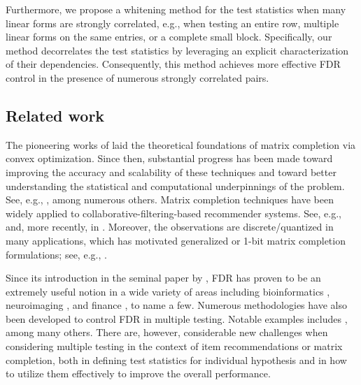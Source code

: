 \documentclass[12pt]{article}
\theoremstyle{plain}
\begin{document}
\begin{sloppypar}
Furthermore, we propose a whitening method for the test statistics when many linear forms are strongly correlated, e.g., when testing an entire row, multiple linear forms on the same entries, or a complete small block. Specifically, our method decorrelates the test statistics by leveraging an explicit characterization of their dependencies. Consequently, this method achieves more effective FDR control in the presence of numerous strongly correlated pairs. 



\subsection{Related work}

The pioneering works of \cite{candes2009power,candes2010matrix,candes2012exact} laid the theoretical foundations of matrix completion via convex optimization. Since then, substantial progress has been made toward improving the accuracy and scalability of these techniques and toward better understanding the statistical and computational underpinnings of the problem. See, e.g., \cite{cai2010singular,keshavan2010matrix,recht2010guaranteed,gross2011recovering,koltchinskii2011nuclear,liu2011universal,negahban2011estimation,rohde2011estimation,tsybakov2011nuclear,negahban2012restricted,sun2012calibrated,klopp2014noisy,cai2015rop,cai2016matrix,gao2016optimal}, among numerous others. Matrix completion techniques have been widely applied to collaborative-filtering-based recommender systems. See, e.g., \cite{koren2009matrix,davidson2010youtube,mcauley2013hidden,das2017survey} and, more recently, in \cite{chen2022review,han2024keyword}. Moreover, the observations are discrete/quantized in many applications, which has motivated generalized or 1-bit matrix completion formulations; see, e.g., \citep{davenport20141}.


Since its introduction in the seminal paper by \cite{benjamini1995controlling}, FDR has proven to be an extremely useful notion in a wide variety of areas including bioinformatics \citep{jung2005sample,roeder2009genome,brzyski2017controlling}, neuroimaging \citep{perone2004false,chumbley2010topological}, and finance \citep{barras2010false,bajgrowicz2012technical}, to name a few. Numerous methodologies have also been developed to control FDR in multiple testing. Notable examples includes \cite{benjamini2001control,sarkar2002some,wu2008false,clarke2009robustness,barber2015controlling,candes2018panning,barber2019knockoff}, among many others. There are, however, considerable new challenges when considering multiple testing in the context of item recommendations or matrix completion, both in defining test statistics for individual hypothesis and in how to utilize them effectively to improve the overall performance.


\end{sloppypar}
\end{document}
